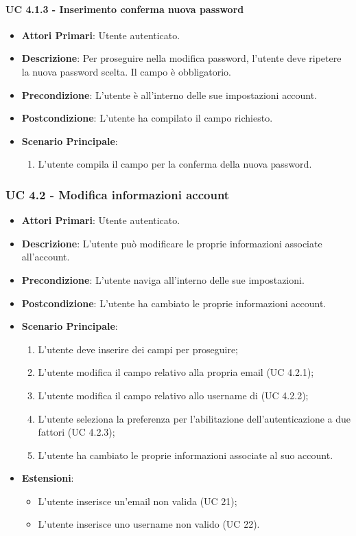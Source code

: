 				\paragraph{UC 4.1.3 - Inserimento conferma nuova password}
				\begin{itemize}
					\item \textbf{Attori Primari}: Utente autenticato.
					\item \textbf{Descrizione}: Per proseguire nella modifica password, l'utente deve ripetere la nuova password scelta. Il campo è obbligatorio.
					\item \textbf{Precondizione}: L'utente è all'interno delle sue impostazioni account.
					\item \textbf{Postcondizione}: L'utente ha compilato il campo richiesto.
					\item \textbf{Scenario Principale}:
					\begin{enumerate}
						\item L'utente compila il campo per la conferma della nuova password.
					\end{enumerate}
				\end{itemize}

			\subsubsection{UC 4.2 - Modifica informazioni account}
			\begin{itemize}
				\item \textbf{Attori Primari}: Utente autenticato.
				\item \textbf{Descrizione}: L'utente può modificare le proprie informazioni associate all'account.
				\item \textbf{Precondizione}: L'utente naviga all'interno delle sue impostazioni.
				\item \textbf{Postcondizione}: L'utente ha cambiato le proprie informazioni account.
				\item \textbf{Scenario Principale}:
				\begin{enumerate}
					\item L'utente deve inserire dei campi per proseguire;
					\item L'utente modifica il campo relativo alla propria email (UC 4.2.1);
					\item L'utente modifica il campo relativo allo username di  (UC 4.2.2);
					\item L'utente seleziona la preferenza per l'abilitazione dell'autenticazione a due fattori (UC 4.2.3);
					\item L'utente ha cambiato le proprie informazioni associate al suo account.
				\end{enumerate}	
				\item \textbf{Estensioni}:
					\begin{itemize}
						\item L'utente inserisce un'email non valida (UC 21);
						\item L'utente inserisce uno username  non valido (UC 22).
					\end{itemize}
			\end{itemize}

